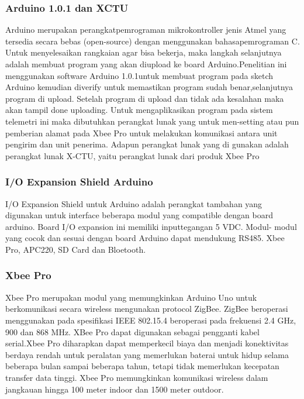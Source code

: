 \subsubsection {Arduino 1.0.1 dan XCTU}
Arduino merupakan perangkatpemrograman mikrokontroller jenis Atmel yang tersedia secara bebas (open-source)
dengan menggunakan bahasapemrograman C. Untuk menyelesaikan rangkaian agar bisa bekerja, maka langkah selanjutnya adalah membuat program yang
akan diupload ke board Arduino.Penelitian ini menggunakan software Arduino 1.0.1untuk membuat program pada sketch Arduino kemudian diverify
untuk memastikan program sudah benar,selanjutnya program di upload. Setelah program di upload dan tidak ada kesalahan
maka akan tampil done uploading. Untuk mengaplikasikan program pada sistem telemetri ini maka dibutuhkan perangkat lunak yang untuk men-setting atau pun pemberian alamat pada Xbee Pro untuk melakukan komunikasi antara unit pengirim dan unit penerima. Adapun
perangkat lunak yang di gunakan adalah perangkat lunak X-CTU, yaitu perangkat lunak dari produk Xbee Pro

\subsubsection  {I/O Expansion Shield Arduino}
I/O Expansion Shield untuk Arduino adalah perangkat tambahan yang digunakan untuk interface beberapa modul yang compatible dengan board arduino. Board I/O expansion ini memiliki inputtegangan 5 VDC. Modul- modul yang cocok dan sesuai dengan board Arduino dapat mendukung RS485. Xbee Pro, APC220, SD Card dan Bloetooth.

\subsubsection {Xbee Pro}
 Xbee Pro merupakan modul yang memungkinkan Arduino Uno untuk berkomunikasi secara wireless
mengunakan protocol ZigBee. ZigBee beroperasi menggunakan pada spesifikasi IEEE 802.15.4 beroperasi pada frekuensi
2.4 GHz, 900 dan 868 MHz. XBee Pro dapat digunakan sebagai pengganti kabel serial.Xbee Pro diharapkan dapat memperkecil biaya dan menjadi
konektivitas berdaya rendah untuk peralatan yang memerlukan baterai untuk hidup selama beberapa bulan sampai beberapa tahun, tetapi tidak memerlukan kecepatan transfer data tinggi. Xbee Pro memungkinkan komunikasi wireless dalam jangkauan hingga 100 meter indoor dan 1500 meter outdoor.
